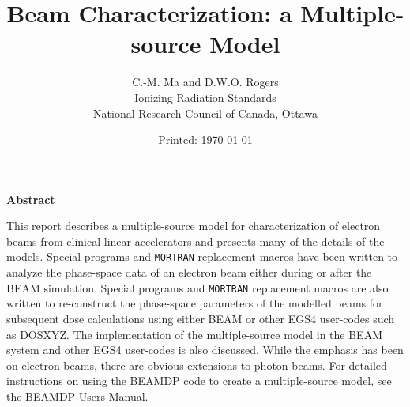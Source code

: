 \documentclass[12pt,twoside]{article}
\begin{document}

\pagestyle{empty}


\title{Beam Characterization: a Multiple-source Model}
\author{ C.-M. Ma and D.W.O. Rogers \\
Ionizing Radiation Standards\\
National Research Council of Canada,
Ottawa\\
}
\date{Printed: \today}
\maketitle


\setlength{\parindent}{0em}

\begin{center}
\begin{Large}
{\bf Abstract}
\end{Large}
\end{center}
This report describes a multiple-source model for characterization of
electron beams from clinical linear accelerators and presents many of
the details of the models.  Special programs and
{\tt MORTRAN} replacement macros have been written to analyze  the phase-space
data of an electron beam either during or after the BEAM simulation.
Special programs and {\tt MORTRAN} replacement macros are also written to
re-construct the phase-space parameters of the modelled beams for
subsequent dose calculations using either BEAM or other EGS4 user-codes
such as DOSXYZ. The implementation of the multiple-source model in  the
BEAM system and other EGS4 user-codes is also discussed.
While the emphasis has been on electron beams, there are obvious
extensions to photon beams. For detailed instructions on using the
BEAMDP code to create a multiple-source model, see the BEAMDP Users
Manual\cite{MR95a}.
\end{document}
